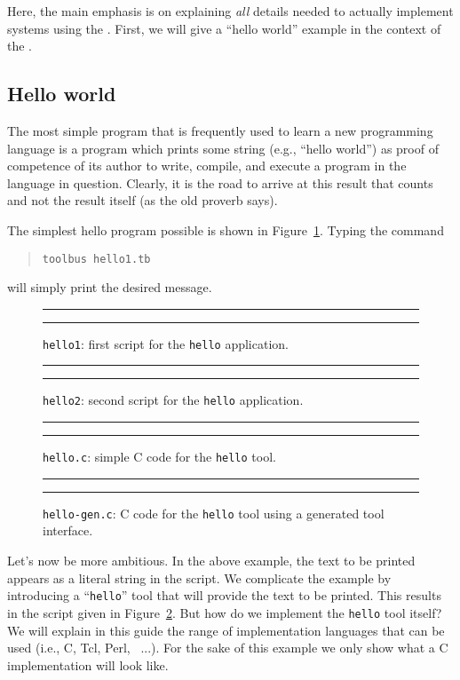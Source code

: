 \documentclass[a4,twoside,noweb]{article} %
\begin{document}
Here, the main  emphasis is on explaining {\em all} details needed to actually
implement systems using the \TB. First, we will give a ``hello world'' example
in the context of the \TB.

\subsection{\label{Hello}Hello world}
The most simple program that is frequently used to learn a new
programming language is a program which prints some string (e.g.,
``hello world'') as proof of competence of its author to write,
compile, and execute a program in the language in question.  Clearly,
it is the road to arrive at this result that counts and not the result
itself (as the old proverb says).

The simplest hello program possible is shown in Figure~\ref{fig:hello1.tb}.
Typing the command
\begin{quote}
{\tt toolbus hello1.tb}
\end{quote}
will simply print the desired message.

\begin{figure}[tb]
\rule{\textwidth}{0.5mm}

  \caption{{\tt hello1}: first script for the {\tt hello} application.}
  \label{fig:hello1.tb}
\rule{\textwidth}{0.5mm}
\end{figure}

\begin{figure}[tb]
\rule{\textwidth}{0.5mm}

  \caption{{\tt hello2}: second script for the {\tt hello} application.}
  \label{fig:hello2.tb}
\rule{\textwidth}{0.5mm}
\end{figure}

\begin{figure}[tb]
\rule{\textwidth}{0.5mm}

  \caption{{\tt hello.c}: simple C code for the {\tt hello} tool.}
  \label{fig:hello.c}
\rule{\textwidth}{0.5mm}
\end{figure}

\begin{figure}[tb]
\rule{\textwidth}{0.5mm}

  \caption{{\tt hello-gen.c}: C code for the {\tt hello} tool using a generated tool interface.}
  \label{fig:hello-gen.c}
\rule{\textwidth}{0.5mm}
\end{figure}

Let's now be more ambitious. In the above example, the text to be printed
appears as a literal string in the script. We complicate the example
by introducing a ``{\tt hello}'' tool that will provide the text to be printed.
This results in the script given in Figure~\ref{fig:hello2.tb}.
But how do we implement the {\tt hello} tool itself?
We will explain in this guide the range of implementation languages that 
can be used (i.e., C, Tcl, Perl, \ASFSDF\ ...).
For the sake of this example we only show what a C implementation will look like.
\end{document}
